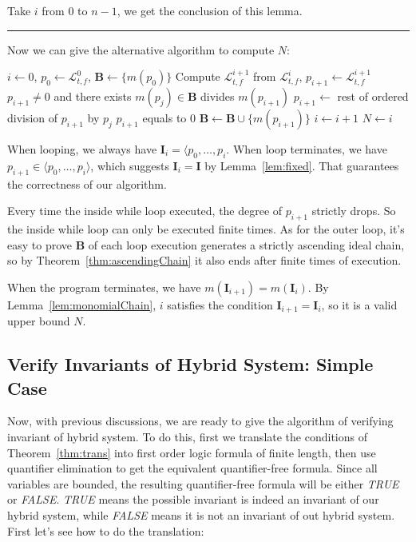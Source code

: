 \documentclass{jssc}
\newcommand{\rulex}{\hfill\rule{1mm}{3mm}}
\begin{document}
Take $i$ from $0$ to $n-1$, we get the conclusion of this lemma.
\rulex

Now we can give the alternative algorithm to compute $N$:

\begin{codebox}
\li 	$i \gets 0$, $p_0 \gets \mathcal{L}_{t, f}^0$, $\boldsymbol{B} \gets \{ m(p_0) \}$
\li 	\While {}
\li		\Do
			Compute $\mathcal{L}_{t, f}^{i+1}$ from $\mathcal{L}_{t, f}^i$, $p_{i+1} \gets \mathcal{L}_{t, f}^{i+1}$
\li			\While $p_{i+1} \neq 0$ and there exists $m(p_j) \in \boldsymbol{B}$ divides $m(p_{i+1})$
\li				\Do
					$p_{i+1} \gets$ rest of ordered division of $p_{i+1}$ by $p_j$
				\End
\li			\If $p_{i+1}$ equals to $0$
\li				\Then
				\End
\li			$\boldsymbol{B} \gets \boldsymbol{B} \cup \{ m(p_{i+1}) \}$
\li			$i \gets i+1$
		\End
\li	$N \gets i$
\end{codebox}

When looping, we always have $\boldsymbol{I}_i = \langle p_0, \dots, p_i$. When loop terminates, we have $p_{i+1} \in \langle p_0, \dots, p_i \rangle$, which suggests $\boldsymbol{I}_i = \boldsymbol{I}$ by Lemma~\ref{lem:fixed}. That guarantees the correctness of our algorithm.

Every time the inside while loop executed, the degree of $p_{i+1}$ strictly drops. So the inside while loop can only be executed finite times. As for the outer loop, it's easy to prove $\boldsymbol{B}$ of each loop execution generates a strictly ascending ideal chain, so by Theorem~\ref{thm:ascendingChain} it also ends after finite times of execution.

When the program terminates, we have $m(\boldsymbol{I}_{i+1}) = m(\boldsymbol{I}_i)$. By Lemma~\ref{lem:monomialChain}, $i$ satisfies the condition $\boldsymbol{I}_{i+1} = \boldsymbol{I}_i$, so it is a valid upper bound $N$.

\subsection{Verify Invariants of Hybrid System: Simple Case}
Now, with previous discussions, we are ready to give the algorithm of verifying invariant of hybrid system. To do this, first we translate the conditions of Theorem~\ref{thm:trans} into first order logic formula of finite length, then use quantifier elimination to get the equivalent quantifier-free formula. Since all variables are bounded, the resulting quantifier-free formula will be either \emph{TRUE} or \emph{FALSE}. \emph{TRUE} means the possible invariant is indeed an invariant of our hybrid system, while \emph{FALSE} means it is not an invariant of out hybrid system. First let's see how to do the translation:
\end{document}
